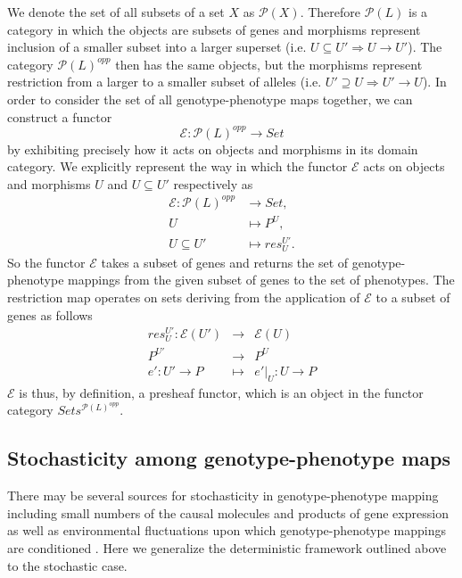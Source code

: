 We denote the set of all subsets of a set $X$ as $\mathcal{P}(X)$. Therefore $\mathcal{P}(L)$ is a category in which the objects are subsets of genes and morphisms represent inclusion of a smaller subset into a larger superset (i.e. $U \subseteq U' \Rightarrow U \rightarrow U'$). The category $\mathcal{P}(L)^{opp}$ then has the same objects, but the morphisms represent restriction from a larger to a smaller subset of alleles (i.e. $U' \supseteq U \Rightarrow U' \rightarrow U$). In order to consider the set of all genotype-phenotype maps together, we can construct a functor
$$
\mathcal{E} \colon \mathcal{P}(L)^{opp} \rightarrow Set
$$
by exhibiting precisely how it acts on objects and morphisms in its domain category. We explicitly represent the way in which the functor $\mathcal{E}$ acts on objects and morphisms $U$ and $U \subseteq U'$ respectively as
\begin{equation}\label{eq:gpfunctor}
\begin{split}
\mathcal{E} \colon \mathcal{P}(L)^{opp} &\rightarrow Set,\\
U &\mapsto P^U,\\
U \subseteq U' &\mapsto res^{U'}_{U}.
\end{split}
\end{equation}
So the functor $\mathcal{E}$ takes a subset of genes and returns the set of genotype-phenotype mappings from the given subset of genes to the set of phenotypes. The restriction map operates on sets deriving from the application of $\mathcal{E}$ to a subset of genes as follows
\begin{eqnarray*}
res^{U'}_{U} \colon \mathcal{E}(U') &\rightarrow& \mathcal{E}(U)\\
P^{U'} &\rightarrow& P^U\\
e' \colon U' \rightarrow P &\mapsto& e'|_U \colon U \rightarrow P
\end{eqnarray*}
$\mathcal{E}$ is thus, by definition, a presheaf functor, which is an object in the functor category $Sets^{\mathcal{P}(L)^{opp}}$.

\subsection*{Stochasticity among genotype-phenotype maps}
There may be several sources for stochasticity in genotype-phenotype mapping including small numbers of the causal molecules and products of gene expression as well as environmental fluctuations upon which genotype-phenotype mappings are conditioned \cite{Swain2002,Paulsson2004,Thattai2004,Acar2008a,Lestas2010,Munsky2012,Neuert2013}. Here we generalize the deterministic framework outlined above to the stochastic case.

